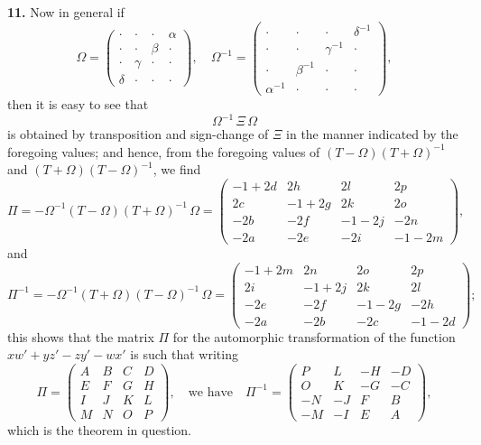 \documentclass[11pt]{article}
\begin{document}
\textbf{11.} Now in general if
\[
\Omega = \begin{pmatrix} \cdot & \cdot & \cdot & \alpha \\ \cdot & \cdot & \beta & \cdot \\ \cdot & \gamma & \cdot & \cdot \\ \delta & \cdot & \cdot & \cdot \end{pmatrix},\quad
\Omega^{-1} = \begin{pmatrix} \cdot & \cdot & \cdot & \delta^{-1} \\ \cdot & \cdot & \gamma^{-1} & \cdot \\ \cdot & \beta^{-1} & \cdot & \cdot \\ \alpha^{-1} & \cdot & \cdot & \cdot \end{pmatrix},
\]
then it is easy to see that
\[
\Omega^{-1}\,\Xi\,\Omega
\]
is obtained by transposition and sign-change of $\Xi$ in the manner indicated by the foregoing values; and hence, from the foregoing values of $(T - \Omega)(T + \Omega)^{-1}$ and $(T + \Omega)(T - \Omega)^{-1}$, we find
\[
\Pi = -\Omega^{-1}(T - \Omega)(T + \Omega)^{-1}\,\Omega = \begin{pmatrix} -1 + 2d & 2h & 2l & 2p \\ 2c & -1 + 2g & 2k & 2o \\ -2b & -2f & -1 - 2j & -2n \\ -2a & -2e & -2i & -1 - 2m \end{pmatrix},
\]
and
\[
\Pi^{-1} = -\Omega^{-1}(T + \Omega)(T - \Omega)^{-1}\,\Omega = \begin{pmatrix} -1 + 2m & 2n & 2o & 2p \\ 2i & -1 + 2j & 2k & 2l \\ -2e & -2f & -1 - 2g & -2h \\ -2a & -2b & -2c & -1 - 2d \end{pmatrix};
\]
this shows that the matrix $\Pi$ for the automorphic transformation of the function $x w' + y z' - z y' - w x'$ is such that writing
\[
\Pi = \begin{pmatrix} A & B & C & D \\ E & F & G & H \\ I & J & K & L \\ M & N & O & P \end{pmatrix},\quad
\text{we have}\quad
\Pi^{-1} = \begin{pmatrix} P & L & -H & -D \\ O & K & -G & -C \\ -N & -J & F & B \\ -M & -I & E & A \end{pmatrix},
\]
which is the theorem in question.
\end{document}
